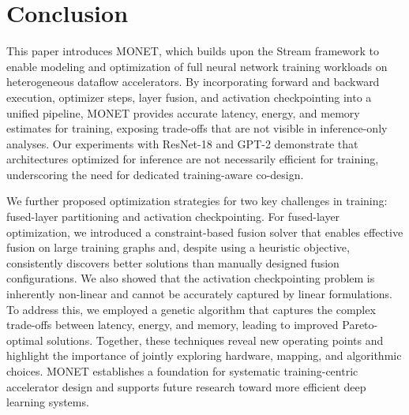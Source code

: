 \documentclass[lettersize,journal]{IEEEtran}
\begin{document}



\section{Conclusion}\label{sec:conclusion}

This paper introduces MONET, which builds upon the Stream framework to enable modeling and optimization of full neural network training workloads on heterogeneous dataflow accelerators. By incorporating forward and backward execution, optimizer steps, layer fusion, and activation checkpointing into a unified pipeline, MONET provides accurate latency, energy, and memory estimates for training, exposing trade-offs that are not visible in inference-only analyses. Our experiments with ResNet-18 and GPT-2 demonstrate that architectures optimized for inference are not necessarily efficient for training, underscoring the need for dedicated training-aware co-design.

We further proposed optimization strategies for two key challenges in training: fused-layer partitioning and activation checkpointing. For fused-layer optimization, we introduced a constraint-based fusion solver that enables effective fusion on large training graphs and, despite using a heuristic objective, consistently discovers better solutions than manually designed fusion configurations. We also showed that the activation checkpointing problem is inherently non-linear and cannot be accurately captured by linear formulations. To address this, we employed a genetic algorithm that captures the complex trade-offs between latency, energy, and memory, leading to improved Pareto-optimal solutions. Together, these techniques reveal new operating points and highlight the importance of jointly exploring hardware, mapping, and algorithmic choices. MONET establishes a foundation for systematic training-centric accelerator design and supports future research toward more efficient deep learning systems.
\end{document}
